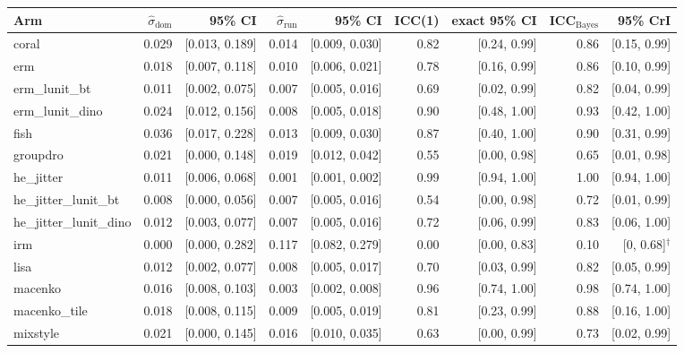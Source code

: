 \begin{tabular}{lrrrrrrrr}
\toprule
Arm & $\hat\sigma_\text{dom}$ & 95\% CI & $\hat\sigma_\text{run}$ & 95\% CI & ICC(1) & exact 95\% CI & ICC$_\text{Bayes}$ & 95\% CrI \\
\midrule
coral & 0.029 & [0.013, 0.189] & 0.014 & [0.009, 0.030] & 0.82 & [0.24, 0.99] & 0.86 & [0.15, 0.99] \\
erm & 0.018 & [0.007, 0.118] & 0.010 & [0.006, 0.021] & 0.78 & [0.16, 0.99] & 0.86 & [0.10, 0.99] \\
erm\_lunit\_bt & 0.011 & [0.002, 0.075] & 0.007 & [0.005, 0.016] & 0.69 & [0.02, 0.99] & 0.82 & [0.04, 0.99] \\
erm\_lunit\_dino & 0.024 & [0.012, 0.156] & 0.008 & [0.005, 0.018] & 0.90 & [0.48, 1.00] & 0.93 & [0.42, 1.00] \\
fish & 0.036 & [0.017, 0.228] & 0.013 & [0.009, 0.030] & 0.87 & [0.40, 1.00] & 0.90 & [0.31, 0.99] \\
groupdro & 0.021 & [0.000, 0.148] & 0.019 & [0.012, 0.042] & 0.55 & [0.00, 0.98] & 0.65 & [0.01, 0.98] \\
he\_jitter & 0.011 & [0.006, 0.068] & 0.001 & [0.001, 0.002] & 0.99 & [0.94, 1.00] & 1.00 & [0.94, 1.00] \\
he\_jitter\_lunit\_bt & 0.008 & [0.000, 0.056] & 0.007 & [0.005, 0.016] & 0.54 & [0.00, 0.98] & 0.72 & [0.01, 0.99] \\
he\_jitter\_lunit\_dino & 0.012 & [0.003, 0.077] & 0.007 & [0.005, 0.016] & 0.72 & [0.06, 0.99] & 0.83 & [0.06, 1.00] \\
irm & 0.000 & [0.000, 0.282] & 0.117 & [0.082, 0.279] & 0.00 & [0.00, 0.83] & 0.10 & [0, 0.68]$^\dagger$ \\
lisa & 0.012 & [0.002, 0.077] & 0.008 & [0.005, 0.017] & 0.70 & [0.03, 0.99] & 0.82 & [0.05, 0.99] \\
macenko & 0.016 & [0.008, 0.103] & 0.003 & [0.002, 0.008] & 0.96 & [0.74, 1.00] & 0.98 & [0.74, 1.00] \\
macenko\_tile & 0.018 & [0.008, 0.115] & 0.009 & [0.005, 0.019] & 0.81 & [0.23, 0.99] & 0.88 & [0.16, 1.00] \\
mixstyle & 0.021 & [0.000, 0.145] & 0.016 & [0.010, 0.035] & 0.63 & [0.00, 0.99] & 0.73 & [0.02, 0.99] \\

\end{tabular}

